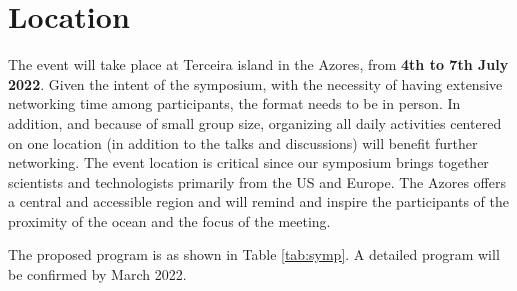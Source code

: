 \section{Location}

The event will take place at Terceira island in the Azores, from
\textbf{4th to 7th July 2022}. Given the intent of the symposium, with
the necessity of having extensive networking time among participants,
the format needs to be in person. In addition, and because of small
group size, organizing all daily activities centered on one location
(in addition to the talks and discussions) will benefit further
networking. The event location is critical since our symposium brings
together scientists and technologists primarily from the US and
Europe. The Azores offers a central and accessible region and will
remind and inspire the participants of the proximity of the ocean and
the focus of the meeting.

\noindent
The proposed program is as shown in Table \ref{tab:symp}. A detailed
program will be confirmed by March 2022.

